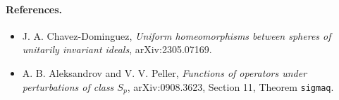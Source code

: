 \documentclass[11pt]{article}
\begin{document}
\paragraph{References.}
\begin{itemize}
\item J. A. Chavez-Dominguez, \emph{Uniform homeomorphisms between spheres
of unitarily invariant ideals}, arXiv:2305.07169.
\item A. B. Aleksandrov and V. V. Peller, \emph{Functions of operators under
perturbations of class \(S_p\)}, arXiv:0908.3623, Section 11,
Theorem \texttt{sigmaq}.
\end{itemize}
\end{document}
